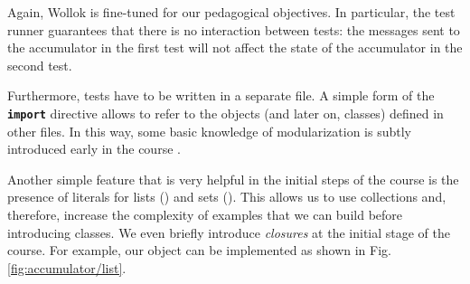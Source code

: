 Again, Wollok is fine-tuned for our pedagogical objectives.
In particular, the test runner guarantees that there is no interaction between tests: the messages sent to the accumulator in the first test will not affect the state of the accumulator in the second test.

Furthermore, tests have to be written in a separate file.
A simple form of the \texttt{\textbf{import}} directive allows to refer to the objects (and later on, classes) defined in other files.
In this way, some basic knowledge of modularization is subtly introduced early in the course%
.


\medskip
Another simple feature that is very helpful in the initial steps of the course is the presence of literals for lists (\eg \code{[1,2,3]}) and sets (\eg {}).
This allows us to use collections and, therefore, increase the complexity of examples that we can build before introducing classes.
We even briefly introduce \emph{closures} at the initial stage of the course.
For example, our  object can be implemented as shown in Fig. \ref{fig:accumulator/list}.

